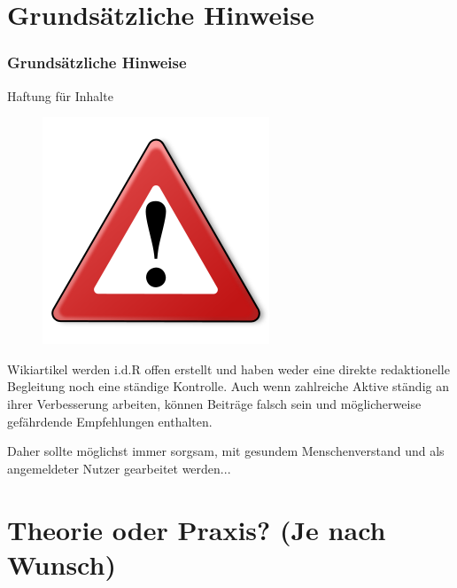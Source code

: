 \documentclass{beamer}              %
\begin{document}
\section{Grundsätzliche Hinweise}

\begin{frame}
  \frametitle{Grundsätzliche Hinweise}{Haftung für Inhalte}

  \begin{figure}
      \includegraphics[scale=0.25]{Warning_256px}
      \label{fig:Warnschild}
  \end{figure}  
 
  \begin{block}{}
    Wikiartikel werden i.d.R offen erstellt und haben weder eine direkte redaktionelle
    Begleitung noch eine ständige Kontrolle. Auch wenn zahlreiche Aktive
    ständig an ihrer Verbesserung arbeiten, können Beiträge falsch sein und
    möglicherweise gefährdende Empfehlungen enthalten.
  \end{block}
  \begin{block}{}
    Daher sollte möglichst immer sorgsam, mit gesundem
    Menschenverstand und als angemeldeter Nutzer gearbeitet werden...
  \end{block}
\end{frame}

\section{Theorie oder Praxis? (Je nach Wunsch)}
\end{document}
